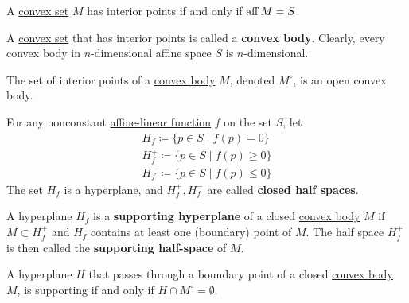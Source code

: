   \begin{theorem}
    \label{thm:interior-points-and-the-affine-hull}
    A \hyperref[def:convex-set]{convex set} $M$ has interior points if and only if $\operatorname{aff} M = S$. 
  \end{theorem}

  \begin{definition}
    \label{def:convex-body}
    A \hyperref[def:convex-set]{convex set} that has interior points is called a \textbf{convex body}. Clearly, every convex body in $n$-dimensional affine space $S$ is $n$-dimensional. 
  \end{definition}

  The set of interior points of a \hyperref[def:convex-body]{convex body} $M$, denoted $M^\circ$, is an open convex body. 

  \begin{definition}
    \label{def:hyperplanes-and-closed-half-spaces}
    For any nonconstant \hyperref[def:affine-linear-function]{affine-linear function} $f$ on the set $S$, let
    \begin{align*}
      H_f \coloneqq \{p \in S \;|\; f(p) = 0\} \\
      H^+_f \coloneqq \{p \in S \;|\; f(p) \geq 0\} \\
      H^-_f \coloneqq \{p \in S \;|\; f(p) \leq 0\}
    \end{align*}
    The set $H_f$ is a hyperplane, and $H^+_f, H^-_f$ are called \textbf{closed half spaces}. 
  \end{definition}

  \begin{definition}
    \label{def:supporting-hyperplane}
    A hyperplane $H_f$ is a \textbf{supporting hyperplane} of a closed \hyperref[def:convex-body]{convex body} $M$ if $M \subset H^+_f$ and $H_f$ contains at least one (boundary) point of $M$. The half space $H^+_f$ is then called the \textbf{supporting half-space} of $M$. 
  \end{definition}

  \begin{theorem}
    \label{thm:criterion-for-a-supporting-hyperplane}
    A hyperplane $H$ that passes through a boundary point of a closed \hyperref[def:convex-body]{convex body} $M$, is supporting if and only if $H \cap M^\circ = \emptyset$. 
  \end{theorem}

